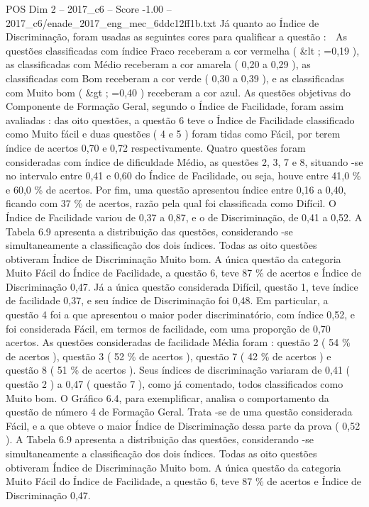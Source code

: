 \begin{textsample}{POS Dim 2 – 2017\_c6 – Score -1.00 – 2017\_c6/enade\_2017\_eng\_mec\_6ddc12ff1b.txt}
Já quanto ao Índice de Discriminação, foram usadas as seguintes cores para qualificar a questão :  As questões classificadas com índice Fraco receberam a cor vermelha ( \&lt ; =0,19 ), as classificadas com Médio receberam a cor amarela ( 0,20 a 0,29 ), as classificadas com Bom receberam a cor verde ( 0,30 a 0,39 ), e as classificadas com Muito bom ( \&gt ; =0,40 ) receberam a cor azul.
As questões objetivas do Componente de Formação Geral, segundo o Índice de Facilidade, foram assim avaliadas : das oito questões, a questão 6 teve o Índice de Facilidade classificado como Muito fácil e duas questões ( 4 e 5 ) foram tidas como Fácil, por terem índice de acertos 0,70 e 0,72 respectivamente.
Quatro questões foram consideradas com índice de dificuldade Médio, as questões 2, 3, 7 e 8, situando -se no intervalo entre 0,41 e 0,60 do Índice de Facilidade, ou seja, houve entre 41,0 \% e 60,0 \% de acertos.
Por fim, uma questão apresentou índice entre 0,16 a 0,40, ficando com 37 \% de acertos, razão pela qual foi classificada como Difícil.
O Índice de Facilidade variou de 0,37 a 0,87, e o de Discriminação, de 0,41 a 0,52.
A Tabela 6.9 apresenta a distribuição das questões, considerando -se simultaneamente a classificação dos dois índices.
Todas as oito questões obtiveram Índice de Discriminação Muito bom.
A única questão da categoria Muito Fácil do Índice de Facilidade, a questão 6, teve 87 \% de acertos e Índice de Discriminação 0,47.
Já a única questão considerada Difícil, questão 1, teve índice de facilidade 0,37, e seu índice de Discriminação foi 0,48.
Em particular, a questão 4 foi a que apresentou o maior poder discriminatório, com índice 0,52, e foi considerada Fácil, em termos de facilidade, com uma proporção de 0,70 acertos.
As questões consideradas de facilidade Média foram : questão 2 ( 54 \% de acertos ), questão 3 ( 52 \% de acertos ), questão 7 ( 42 \% de acertos ) e questão 8 ( 51 \% de acertos ).
Seus índices de discriminação variaram de 0,41 ( questão 2 ) a 0,47 ( questão 7 ), como já comentado, todos classificados como Muito bom.
O Gráfico 6.4, para exemplificar, analisa o comportamento da questão de número 4 de Formação Geral.
Trata -se de uma questão considerada Fácil, e a que obteve o maior Índice de Discriminação dessa parte da prova ( 0,52 ).
A Tabela 6.9 apresenta a distribuição das questões, considerando -se simultaneamente a classificação dos dois índices.
Todas as oito questões obtiveram Índice de Discriminação Muito bom.
A única questão da categoria Muito Fácil do Índice de Facilidade, a questão 6, teve 87 \% de acertos e Índice de Discriminação 0,47.

\end{textsample}
